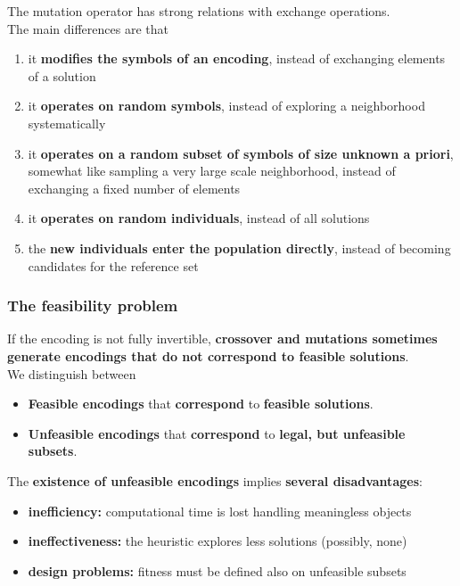 \documentclass[11pt]{article}
\begin{document}
	The mutation operator has strong relations with exchange operations.\\
	The main differences are that
	\begin{enumerate}
		\item it \textbf{modifies the symbols of an encoding}, instead of exchanging elements of a solution
		\item it \textbf{operates on random symbols}, instead of exploring a neighborhood systematically
		\item it \textbf{operates on a random subset of symbols of size unknown a priori}, somewhat like sampling a very large scale neighborhood, instead of exchanging a fixed number of elements
		\item it \textbf{operates on random individuals}, instead of all solutions
		\item the \textbf{new individuals enter the population directly}, instead of becoming candidates for the reference set
	\end{enumerate}
	
	\newpage
	
	\subsubsection{The feasibility problem}
	If the encoding is not fully invertible, \textbf{crossover and mutations sometimes generate encodings that do not correspond to feasible solutions}.\\
	
	We distinguish between
	\begin{itemize}
		\item \textbf{Feasible encodings} that \textbf{correspond} to \textbf{feasible solutions}.\\
		
		\item \textbf{Unfeasible encodings} that \textbf{correspond} to \textbf{legal, but unfeasible subsets}.\\
	\end{itemize}
	
	The \textbf{existence of unfeasible encodings} implies \textbf{several disadvantages}:
	\begin{itemize}
		\item \textbf{inefficiency:} computational time is lost handling meaningless objects
		\item \textbf{ineffectiveness:} the heuristic explores less solutions (possibly, none)
		\item \textbf{design problems:} fitness must be defined also on unfeasible subsets
	\end{itemize}
	\nn
	
\end{document}
